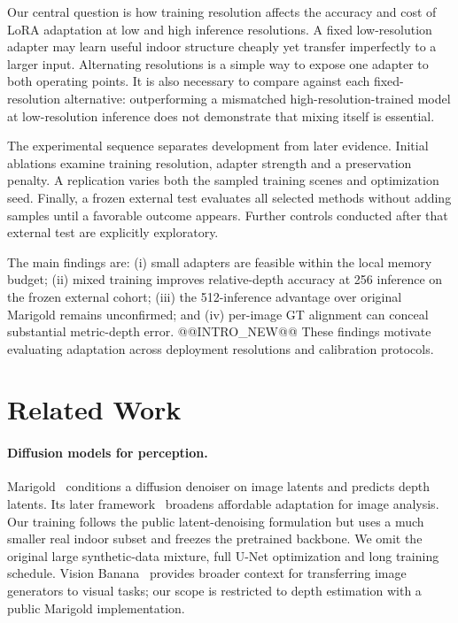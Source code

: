 \documentclass[10pt,twocolumn,letterpaper]{article}
\begin{document}
Our central question is how training resolution affects the accuracy and cost of LoRA adaptation at low and high inference resolutions. A fixed low-resolution adapter may learn useful indoor structure cheaply yet transfer imperfectly to a larger input. Alternating resolutions is a simple way to expose one adapter to both operating points. It is also necessary to compare against each fixed-resolution alternative: outperforming a mismatched high-resolution-trained model at low-resolution inference does not demonstrate that mixing itself is essential.

The experimental sequence separates development from later evidence. Initial ablations examine training resolution, adapter strength and a preservation penalty. A replication varies both the sampled training scenes and optimization seed. Finally, a frozen external test evaluates all selected methods without adding samples until a favorable outcome appears. Further controls conducted after that external test are explicitly exploratory.

The main findings are: (i) small adapters are feasible within the local memory budget; (ii) mixed training improves relative-depth accuracy at 256 inference on the frozen external cohort; (iii) the 512-inference advantage over original Marigold remains unconfirmed; and (iv) per-image GT alignment can conceal substantial metric-depth error. @@INTRO_NEW@@ These findings motivate evaluating adaptation across deployment resolutions and calibration protocols.

\section{Related Work}
\paragraph{Diffusion models for perception.}
Marigold~\cite{marigold} conditions a diffusion denoiser on image latents and predicts depth latents. Its later framework~\cite{marigold25} broadens affordable adaptation for image analysis. Our training follows the public latent-denoising formulation but uses a much smaller real indoor subset and freezes the pretrained backbone. We omit the original large synthetic-data mixture, full U-Net optimization and long training schedule. Vision Banana~\cite{banana} provides broader context for transferring image generators to visual tasks; our scope is restricted to depth estimation with a public Marigold implementation.
\end{document}
